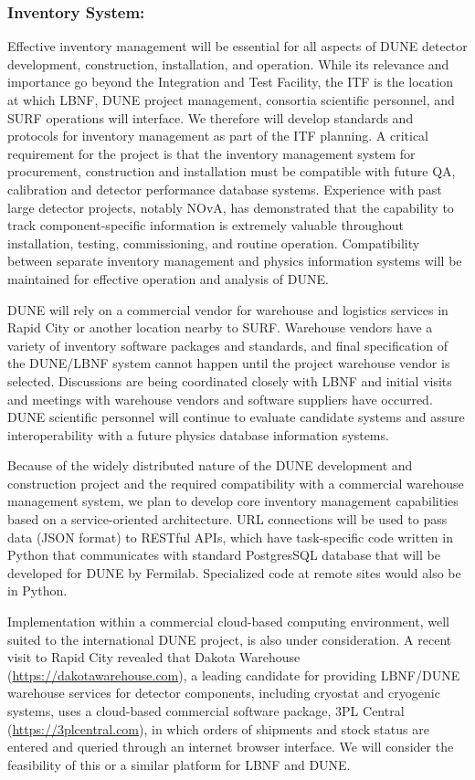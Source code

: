 \subsubsection{Inventory System:}
Effective inventory management will be essential for all aspects of
DUNE detector development, construction, installation, and operation.
While its relevance and importance go beyond the Integration and Test
Facility, the ITF is the location at which LBNF, DUNE project
management, consortia scientific personnel, and SURF operations will
interface.  We therefore will develop standards and protocols for
inventory management as part of the ITF planning.  A critical
requirement for the project is that the inventory management system
for procurement, construction and installation must be compatible with
future QA, calibration and detector performance database systems.
Experience with past large detector projects, notably NOvA, has
demonstrated that the capability to track component-specific
information is extremely valuable throughout installation, testing,
commissioning, and routine operation.  Compatibility between separate
inventory management and physics information systems will be
maintained for effective operation and analysis of DUNE.

DUNE will rely on a commercial vendor for warehouse and logistics
services in Rapid City or another location nearby to SURF.  Warehouse
vendors have a variety of inventory software packages and standards,
and final specification of the DUNE/LBNF system cannot happen until
the project warehouse vendor is selected.  Discussions are being
coordinated closely with LBNF and initial visits and meetings with
warehouse vendors and software suppliers have occurred.  DUNE
scientific personnel will continue to evaluate candidate systems and
assure interoperability with a future physics database
information systems.

Because of the widely distributed nature of the DUNE development and
construction project and the required compatibility with a commercial
warehouse management system, we plan to develop core inventory
management capabilities based on a service-oriented architecture.  URL
connections will be used to pass data (JSON format) to RESTful APIs,
which have task-specific code written in Python that communicates with
standard PostgresSQL database that will be developed for DUNE by
Fermilab.  Specialized code at remote sites would also be in Python.

Implementation within a commercial cloud-based computing environment,
well suited to the international DUNE project, is also under
consideration.  A recent visit to Rapid City revealed that Dakota
Warehouse
(\href{https://dakotawarehouse.com}{https://dakotawarehouse.com}), a
leading candidate for providing LBNF/DUNE warehouse services for
detector components, including cryostat and cryogenic systems, uses a
cloud-based commercial software package, 3PL Central
(\href{https://3plcentral.com}{https://3plcentral.com}), in which
orders of shipments and stock status are entered and queried through
an internet browser interface.  We will consider the feasibility of
this or a similar platform for LBNF and DUNE.

